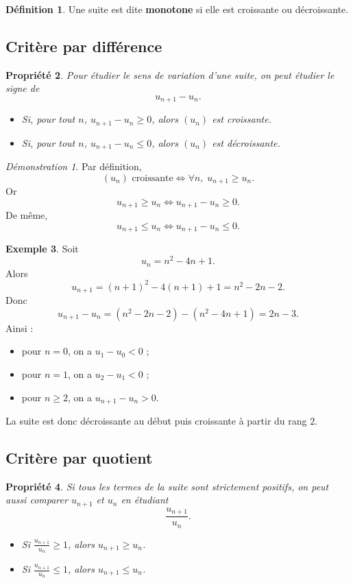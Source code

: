 \documentclass[11pt,a4paper]{article}
\theoremstyle{definition}
\newtheorem{definition}{Définition}[section]
\newtheorem{exemple}[definition]{Exemple}
\theoremstyle{plain}
\newtheorem{propriete}[definition]{Propriété}
\theoremstyle{remark}
\newtheorem*{demonstrationlibre}{Démonstration}
\begin{document}
\begin{definition}
Une suite est dite \textbf{monotone} si elle est croissante ou décroissante.
\end{definition}

\subsection{Critère par différence}

\begin{propriete}
Pour étudier le sens de variation d'une suite, on peut étudier le signe de
\[
u_{n+1}-u_n.
\]
\begin{itemize}[leftmargin=0.8cm]
    \item Si, pour tout $n$, $u_{n+1}-u_n\geq0$, alors $(u_n)$ est croissante.
    \item Si, pour tout $n$, $u_{n+1}-u_n\leq0$, alors $(u_n)$ est décroissante.
\end{itemize}
\end{propriete}

\begin{demonstrationlibre}
Par définition,
\[
(u_n)\text{ croissante}\iff \forall n,\;u_{n+1}\geq u_n.
\]
Or
\[
u_{n+1}\geq u_n\iff u_{n+1}-u_n\geq0.
\]
De même,
\[
u_{n+1}\leq u_n\iff u_{n+1}-u_n\leq0.
\]
\end{demonstrationlibre}

\begin{exemple}
Soit
\[
u_n=n^2-4n+1.
\]
Alors
\[
u_{n+1}=(n+1)^2-4(n+1)+1=n^2-2n-2.
\]
Donc
\[
u_{n+1}-u_n=(n^2-2n-2)-(n^2-4n+1)=2n-3.
\]
Ainsi :
\begin{itemize}[leftmargin=0.8cm]
    \item pour $n=0$, on a $u_1-u_0<0$ ;
    \item pour $n=1$, on a $u_2-u_1<0$ ;
    \item pour $n\geq2$, on a $u_{n+1}-u_n>0$.
\end{itemize}
La suite est donc décroissante au début puis croissante à partir du rang $2$.
\end{exemple}

\subsection{Critère par quotient}

\begin{propriete}
Si tous les termes de la suite sont strictement positifs, on peut aussi comparer $u_{n+1}$ et $u_n$ en étudiant
\[
\frac{u_{n+1}}{u_n}.
\]
\begin{itemize}[leftmargin=0.8cm]
    \item Si $\frac{u_{n+1}}{u_n}\geq1$, alors $u_{n+1}\geq u_n$.
    \item Si $\frac{u_{n+1}}{u_n}\leq1$, alors $u_{n+1}\leq u_n$.
\end{itemize}
\end{propriete}
\end{document}
